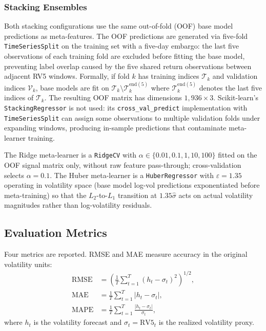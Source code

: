 \documentclass[12pt]{article}
\begin{document}
\subsubsection*{Stacking Ensembles}

Both stacking configurations use the same out-of-fold (OOF) base model
predictions as meta-features.  The OOF predictions are generated via
five-fold \texttt{TimeSeriesSplit} on the training set with a five-day
embargo: the last five observations of each training fold are excluded before
fitting the base model, preventing label overlap caused by the five shared
return observations between adjacent RV5 windows.  Formally, if fold $k$
has training indices $\mathcal{T}_{k}$ and validation indices
$\mathcal{V}_{k}$, base models are fit on
$\mathcal{T}_{k} \setminus \mathcal{T}_{k}^{\text{end}(5)}$ where
$\mathcal{T}_{k}^{\text{end}(5)}$ denotes the last five indices of
$\mathcal{T}_{k}$.  The resulting OOF matrix has dimensions
$1{,}936 \times 3$.  Scikit-learn's \texttt{StackingRegressor} is not used:
its \texttt{cross\_val\_predict} implementation with \texttt{TimeSeriesSplit}
can assign some observations to multiple validation folds under expanding
windows, producing in-sample predictions that contaminate meta-learner
training.

The Ridge meta-learner is a \texttt{RidgeCV} with $\alpha \in \{0.01, 0.1,
1, 10, 100\}$ fitted on the OOF signal matrix only, without raw feature
pass-through; cross-validation selects $\alpha = 0.1$.  The Huber
meta-learner is a \texttt{HuberRegressor} with $\varepsilon = 1.35$
operating in volatility space (base model log-vol predictions exponentiated
before meta-training) so that the $L_{2}$-to-$L_{1}$ transition at
$1.35\hat{\sigma}$ acts on actual volatility magnitudes rather than
log-volatility residuals.

\subsection{Evaluation Metrics}

Four metrics are reported.  RMSE and MAE measure accuracy in the original
volatility units:
\begin{align}
  \text{RMSE} &= \left(\frac{1}{T}\sum_{t=1}^{T}
    (h_{t} - \sigma_{t})^{2}\right)^{1/2}, \\
  \text{MAE}  &= \frac{1}{T}\sum_{t=1}^{T}|h_{t} - \sigma_{t}|, \\
  \text{MAPE} &= \frac{1}{T}\sum_{t=1}^{T}
    \frac{|h_{t} - \sigma_{t}|}{\sigma_{t}},
\end{align}
where $h_{t}$ is the volatility forecast and $\sigma_{t} = \text{RV5}_{t}$
is the realized volatility proxy.
\end{document}

